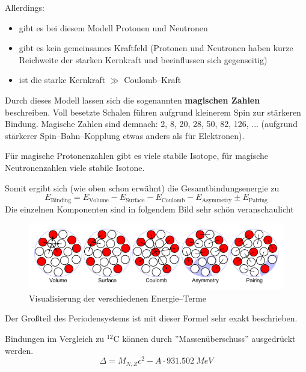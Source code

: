 \documentclass[Ex4_Zusammenfassung.tex]{subfiles}
\begin{document}
\begin{enumerate}
	Allerdings:
		\begin{itemize}
			\item gibt es bei diesem Modell Protonen und Neutronen
			\item gibt es kein gemeinsames Kraftfeld (Protonen und Neutronen haben kurze Reichweite der starken Kernkraft und beeinflussen sich gegenseitig)
			\item ist die starke Kernkraft $\gg$ Coulomb--Kraft
		\end{itemize}
	Durch dieses Modell lassen sich die sogenannten \textbf{magischen Zahlen} beschreiben. Voll besetzte Schalen führen aufgrund kleinerem Spin zur stärkeren Bindung. Magische Zahlen sind demnach: 2, 8, 20, 28, 50, 82, 126, ... (aufgrund stärkerer Spin--Bahn--Kopplung etwas anders als für Elektronen). 
	
	Für magische Protonenzahlen gibt es viele stabile Isotope, für magische Neutronenzahlen viele stabile Isotone.
\end{enumerate}
Somit ergibt sich (wie oben schon erwähnt) die Gesamtbindungsenergie zu
\begin{equation}
	E_{\text{Binding}} = E_{\text{Volume}} - E_{\text{Surface}} - E_{\text{Coulomb}} - E_{\text{Asymmetry}} \pm E_{\text{Pairing}}
\end{equation}
Die einzelnen Komponenten sind in folgendem Bild sehr schön veranschaulicht
\begin{figure}[h]
	\centering
	\includegraphics[scale=0.5]{liquid_drop.png}
	\caption{Visualisierung der verschiedenen Energie--Terme}
\end{figure}
Der Großteil des Periodensystems ist mit dieser Formel sehr exakt beschrieben. 

Bindungen im Vergleich zu $^{12}$C können durch ''Massenüberschuss'' ausgedrückt werden. 
\begin{equation}
	\Delta = M_{N,Z} c^2 - A\cdot \SI{931.502}{MeV}
\end{equation}
\end{document}
